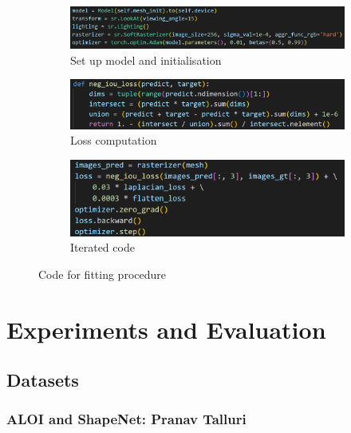 \documentclass{article}
\begin{document}
\begin{figure}[h!]
  \centering
  \begin{subfigure}{.7\textwidth}
    \centering
    \includegraphics[width=\textwidth]{images/fittingcode_a.png}
    \caption{Set up model and initialisation}
    \label{initfitting}
  \end{subfigure}
  \hfill
  \begin{subfigure}{.7\textwidth}
    \centering
    \includegraphics[width=\textwidth]{images/fittingcode_b.png}
    \caption{Loss computation}
    \label{lossfitting}
  \end{subfigure}
  \hfill
  \begin{subfigure}{.7\textwidth}
    \centering
    \includegraphics[width=\textwidth]{images/fittingcode_c.png}
    \caption{Iterated code}
    \label{iterfitted}
  \end{subfigure}
  \caption{Code for fitting procedure}
  \label{fittingcode}
\end{figure}

\newpage
\section{Experiments and Evaluation}
\subsection{Datasets}

\subsubsection{ALOI and ShapeNet: Pranav Talluri}
\end{document}
